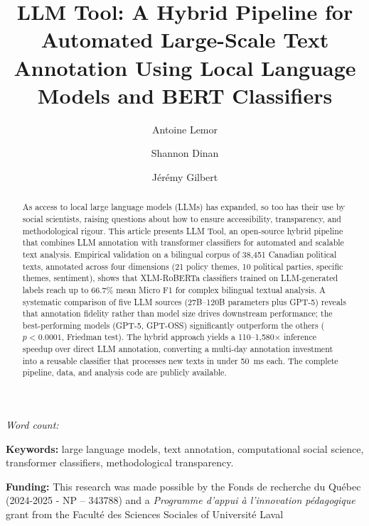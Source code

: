 \documentclass[12pt]{article}
\title{\textbf{LLM Tool: A Hybrid Pipeline for Automated Large-Scale Text Annotation Using Local Language Models and BERT Classifiers}}
\author[1]{Antoine Lemor}
\author[2]{Shannon Dinan}
\author[3]{Jérémy Gilbert}
\affil[1]{Université de Montréal}
\affil[2]{Université Laval}
\affil[3]{Western University}
\date{}
\begin{document}
\maketitle
\thispagestyle{empty}

\immediate{}
\begin{center}
\small\textit{Word count: }
\end{center}

\begin{abstract}
\noindent
As access to local large language models (LLMs) has expanded, so too has their use by social scientists, raising questions about how to ensure accessibility, transparency, and methodological rigour. This article presents LLM Tool, an open-source hybrid pipeline that combines LLM annotation with transformer classifiers for automated and scalable text analysis. Empirical validation on a bilingual corpus of 38,451 Canadian political texts, annotated across four dimensions (21 policy themes, 10 political parties, specific themes, sentiment), shows that XLM-RoBERTa classifiers trained on LLM-generated labels reach up to 66.7\% mean Micro F1 for complex bilingual textual analysis. A systematic comparison of five LLM sources (27B--120B parameters plus GPT-5) reveals that annotation fidelity rather than model size drives downstream performance; the best-performing models (GPT-5, GPT-OSS) significantly outperform the others ($p < 0.0001$, Friedman test). The hybrid approach yields a 110--1,580$\times$ inference speedup over direct LLM annotation, converting a multi-day annotation investment into a reusable classifier that processes new texts in under 50~ms each. The complete pipeline, data, and analysis code are publicly available.
\end{abstract}

\noindent\textbf{Keywords:} large language models, text annotation, computational social science, transformer classifiers, methodological transparency.

\vspace{0.4cm}

\noindent\textbf{Funding:} This research was made possible by the  Fonds de recherche du Québec (2024-2025 - NP – 343788) and a \textit{Programme d’appui à l’innovation pédagogique} grant from the Faculté des Sciences Sociales of Université Laval
\newpage
\end{document}
